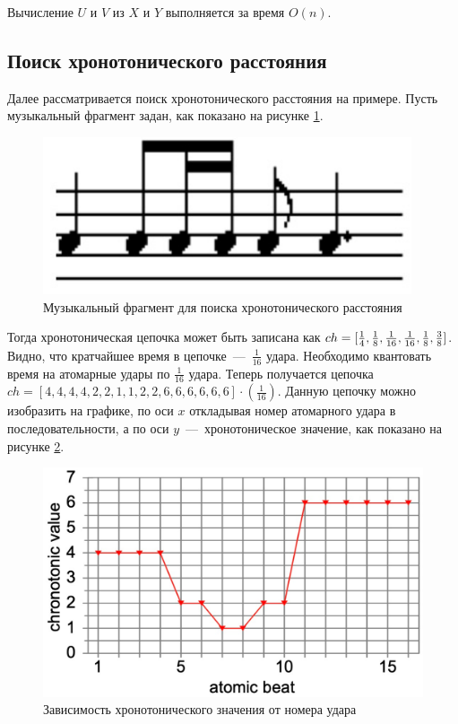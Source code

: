 Вычисление $U$ и $V$ из $X$ и $Y$ выполняется за время $O(n)$.

\subsection{Поиск хронотонического расстояния}
Далее рассматривается поиск хронотонического расстояния на примере. Пусть музыкальный фрагмент задан, как показано на рисунке \ref{img:chr1}.
\newpage
\begin{figure}[h!]
    \centering
    \includegraphics[scale=0.5]{img/chr1.pdf}
    \caption{Музыкальный фрагмент для поиска хронотонического расстояния \cite{bib13}}
    \label{img:chr1}
\end{figure}

Тогда хронотоническая цепочка может быть записана как $ch = [\frac{1}{4}, \frac{1}{8}, \frac{1}{16}, \frac{1}{16},\\ \frac{1}{8}, \frac{3}{8}]$. Видно, что кратчайшее время в цепочке~---~$\frac{1}{16}$ удара. Необходимо квантовать время на атомарные удары по $\frac{1}{16}$ удара. Теперь получается цепочка $ch = [4, 4, 4, 4, 2, 2, 1, 1, 2, 2, 6, 6, 6, 6, 6, 6] \cdot (\frac{1}{16})$. Данную цепочку можно изобразить на графике, по оси $x$ откладывая номер атомарного удара в последовательности, а по оси $y$~---~хронотоническое значение, как показано на рисунке \ref{img:chr2}.

\begin{figure}[h!]
    \centering
    \includegraphics[scale=0.5]{img/chr2.pdf}
    \caption{Зависимость хронотонического значения от номера удара \cite{bib13}}
    \label{img:chr2}
\end{figure}

